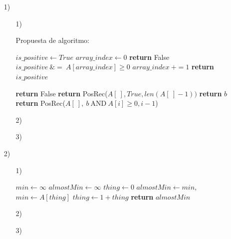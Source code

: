 \documentclass[a4paper, 12pt]{report}
\begin{document}
\begin{enumerate}
\item[1)]{
\begin{enumerate}
    \item[1)]{
        Propuesta de algoritmo:\\
        \begin{algorithmic}[1]
        \State $is\_positive\gets True$
        \State $array\_index\gets 0$
            \State \textbf{return} False
        \EndIf
            \State $is\_positive\ \&=\ A[array\_index] \geq 0$
            \State $array\_index\ += 1$
        \EndWhile\label{euclidendwhile}
        \State \textbf{return} $is\_positive$
        \EndProcedure
    \end{algorithmic}
    \begin{algorithmic}[1]
        \State \textbf{return} False
    \EndIf
    \State \textbf{return} PosRec($A[\ ], True, len(A[\ ]-1))$
    \EndProcedure
        \State \textbf{return} $b$
    \Else
        \State \textbf{return} PosRec($A[\ ],\ b\ \text{AND}\ A[i]\geq0, i - 1$)
    \EndIf
    \EndProcedure
\end{algorithmic}
    }
    \item[2)]{}
    \item[3)]{}
\end{enumerate}
}
\item[2)]{
\begin{enumerate}
    \item[1)]{
        \begin{algorithmic}[1]
            \State $min\gets \infty$
            \State $almostMin\gets \infty$
            \State $thing\gets 0$
                    \State $almostMin\gets min$, $min\gets A[thing]$
                \EndIf
                \State $thing\gets 1 + thing$
            \EndWhile\label{euclidendwhile}
            \State \textbf{return} $almostMin$
            \EndProcedure
        \end{algorithmic}
    }
    \item[2)]{}
    \item[3)]{}
\end{enumerate}
}
\end{enumerate}
\end{document}
